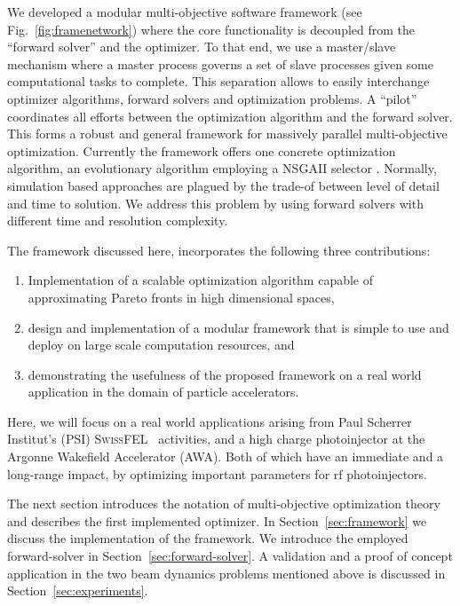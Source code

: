 \documentclass[%
reprint,
amsmath,amssymb,
aps,
prstab,
]{revtex4-1}
\begin{document}
We developed a modular multi-objective software framework (see
  Fig.~\ref{fig:framenetwork}) where the core functionality is decoupled from
  the ``forward solver'' and the optimizer.
To that end, we use a master/slave mechanism where a master process governs a
  set of slave processes given some computational tasks to complete.
This separation allows to easily interchange optimizer algorithms, forward
  solvers and optimization problems.
A ``pilot'' coordinates all efforts between the optimization algorithm and the
  forward solver.
This forms a robust and general framework for massively parallel
  multi-objective optimization.
Currently the framework offers one concrete optimization algorithm, an
  evolutionary algorithm employing a \textsc{NSGAII} selector \cite{pisa}.
Normally, simulation based approaches are plagued by the trade-of between
  level of detail and time to solution.
We address this problem by using forward solvers with different time and
  resolution complexity.

The framework discussed here, incorporates the following three contributions:
%
\begin{enumerate}
  \item Implementation of a scalable optimization algorithm capable of
        approximating Pareto fronts in high dimensional spaces,
  \item design and implementation of a modular framework that is simple to use
        and deploy on large scale computation resources, and
  \item demonstrating the usefulness of the proposed framework on a real world
        application in the domain of particle accelerators.
\end{enumerate}

Here, we will focus on a real world applications arising from Paul Scherrer Institut's (PSI)
  \textsc{SwissFEL}~\cite{pedr:10} activities, and a high charge photoinjector 
  at the Argonne Wakefield Accelerator (AWA). Both of which have an immediate and a
  long-range impact, by optimizing important parameters for rf photoinjectors. 

The next section introduces the notation of multi-objective optimization
  theory and describes the first implemented optimizer.
In Section~\ref{sec:framework} we discuss the implementation of the framework.
We introduce the employed forward-solver in Section~\ref{sec:forward-solver}.
A validation and a proof of concept application in the two beam dynamics problems 
mentioned above is discussed in Section~\ref{sec:experiments}.
\end{document}
